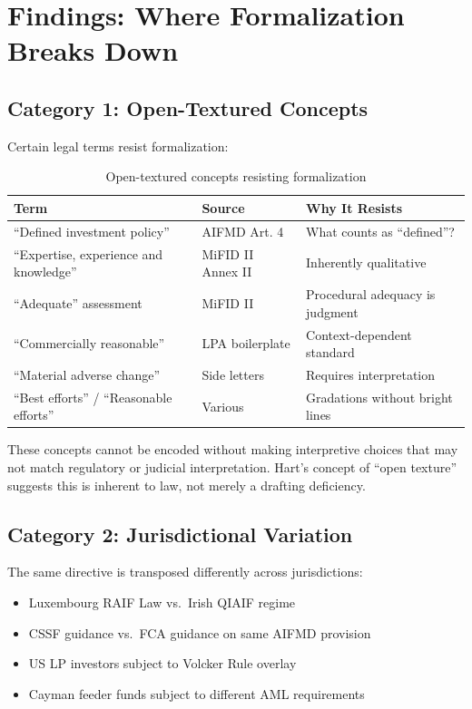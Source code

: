 
\section{Findings: Where Formalization Breaks Down}
\label{sec:findings}

\subsection{Category 1: Open-Textured Concepts}
\label{sec:open-texture}

Certain legal terms resist formalization:

\begin{table}[t]
\centering
\begin{tabular}{@{}lll@{}}
\toprule
Term & Source & Why It Resists \\
\midrule
``Defined investment policy'' & AIFMD Art. 4 & What counts as ``defined''? \\
``Expertise, experience and knowledge'' & MiFID II Annex II & Inherently qualitative \\
``Adequate'' assessment & MiFID II & Procedural adequacy is judgment \\
``Commercially reasonable'' & LPA boilerplate & Context-dependent standard \\
``Material adverse change'' & Side letters & Requires interpretation \\
``Best efforts'' / ``Reasonable efforts'' & Various & Gradations without bright lines \\
\bottomrule
\end{tabular}
\caption{Open-textured concepts resisting formalization}
\label{tab:open-texture}
\end{table}

These concepts cannot be encoded without making interpretive choices that may not match regulatory or judicial interpretation. Hart's concept of ``open texture'' \citep{hart1961concept} suggests this is inherent to law, not merely a drafting deficiency.

\subsection{Category 2: Jurisdictional Variation}
\label{sec:jurisdiction}

The same directive is transposed differently across jurisdictions:

\begin{itemize}
  \item Luxembourg RAIF Law vs.\ Irish QIAIF regime
  \item CSSF guidance vs.\ FCA guidance on same AIFMD provision
  \item US LP investors subject to Volcker Rule overlay
  \item Cayman feeder funds subject to different AML requirements
\end{itemize}

